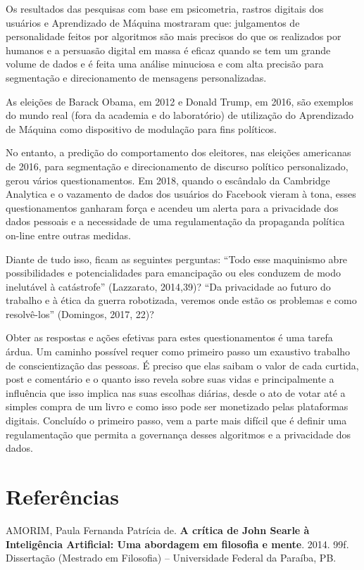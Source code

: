 Os resultados das pesquisas com base em psicometria, rastros digitais
dos usuários e Aprendizado de Máquina mostraram que: julgamentos de
personalidade feitos por algoritmos são mais precisos do que os
realizados por humanos e a persuasão digital em massa é eficaz quando se
tem um grande volume de dados e é feita uma análise minuciosa e com alta
precisão para segmentação e direcionamento de mensagens personalizadas.

As eleições de Barack Obama, em 2012 e Donald Trump, em 2016, são
exemplos do mundo real (fora da academia e do laboratório) de utilização
do Aprendizado de Máquina como dispositivo de modulação para fins
políticos.

No entanto, a predição do comportamento dos eleitores, nas eleições
americanas de 2016, para segmentação e direcionamento de discurso
político personalizado, gerou vários questionamentos. Em 2018, quando o
escândalo da Cambridge Analytica e o vazamento de dados dos usuários do
Facebook vieram à tona, esses questionamentos ganharam força e acendeu
um alerta para a privacidade dos dados pessoais e a necessidade de uma
regulamentação da propaganda política on-line entre outras medidas.

Diante de tudo isso, ficam as seguintes perguntas: ``Todo esse
maquinismo abre possibilidades e potencialidades para emancipação ou
eles conduzem de modo inelutável à catástrofe'' (Lazzarato, 2014,39)?
``Da privacidade ao futuro do trabalho e à ética da guerra robotizada,
veremos onde estão os problemas e como resolvê-los'' (Domingos, 2017,
22)?

Obter as respostas e ações efetivas para estes questionamentos é uma
tarefa árdua. Um caminho possível requer como primeiro passo um
exaustivo trabalho de conscientização das pessoas. É preciso que elas
saibam o valor de cada curtida, post e comentário e o quanto isso revela
sobre suas vidas e principalmente a influência que isso implica nas suas
escolhas diárias, desde o ato de votar até a simples compra de um livro
e como isso pode ser monetizado pelas plataformas digitais. Concluído o
primeiro passo, vem a parte mais difícil que é definir uma
regulamentação que permita a governança desses algoritmos e a
privacidade dos dados.

\section{Referências}

AMORIM, Paula Fernanda Patrícia de. \textbf{A crítica de John Searle à
Inteligência Artificial: Uma abordagem em filosofia e mente}.
2014. 99f. Dissertação (Mestrado em Filosofia) -- Universidade Federal
da Paraíba, PB.

